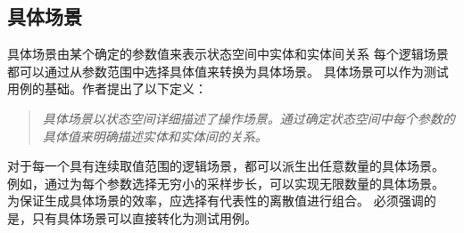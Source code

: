 \subsection{具体场景}
具体场景由某个确定的参数值来表示状态空间中实体和实体间关系
每个逻辑场景都可以通过从参数范围中选择具体值来转换为具体场景。
具体场景可以作为测试用例的基础。作者提出了以下定义：

\begin{quote}
\textit{
具体场景以状态空间详细描述了操作场景。通过确定状态空间中每个参数的具体值来明确描述实体和实体间的关系。
}
\end{quote}

对于每一个具有连续取值范围的逻辑场景，都可以派生出任意数量的具体场景。
例如，通过为每个参数选择无穷小的采样步长，可以实现无限数量的具体场景。
为保证生成具体场景的效率，应选择有代表性的离散值进行组合。
必须强调的是，只有具体场景可以直接转化为测试用例。

